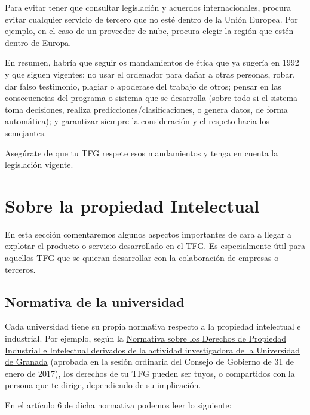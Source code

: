 Para evitar tener que consultar legislación y acuerdos internacionales, procura evitar cualquier servicio de tercero que no esté dentro de la Unión Europea. Por ejemplo, en el caso de un proveedor de nube, procura elegir la región que estén dentro de Europa.

En resumen, habría que seguir os mandamientos de ética que ya sugería \cite{EticaUCM} en 1992 y que siguen vigentes: no usar el ordenador para dañar a otras personas, robar, dar falso testimonio, plagiar o apoderase del trabajo de otros; pensar en las consecuencias del programa o sistema que se desarrolla (sobre todo si el sistema toma decisiones, realiza predicciones/clasificaciones, o genera datos, de forma automática); y garantizar siempre la consideración y el respeto hacia los semejantes.

Asegúrate de que tu TFG respete esos mandamientos y tenga en cuenta la legislación vigente.

\section{Sobre la propiedad Intelectual} %

En esta sección comentaremos algunos aspectos importantes de cara a llegar a explotar el producto o servicio desarrollado en el TFG. Es especialmente útil para aquellos TFG que se quieran desarrollar con la colaboración de empresas o terceros.

\subsection{Normativa de la universidad}

Cada universidad tiene su propia normativa respecto a la propiedad intelectual e industrial. Por ejemplo, según la \href{https://www.ugr.es/sites/default/files/2017-08/NCG1151.pdf}{Normativa sobre los Derechos de Propiedad Industrial e Intelectual derivados de la actividad investigadora de la Universidad de Granada} (aprobada en la sesión ordinaria del Consejo de Gobierno de 31 de enero de 2017), los derechos de tu TFG pueden ser tuyos, o compartidos con la persona que te dirige, dependiendo de su implicación.

En el artículo 6 de dicha normativa podemos leer lo siguiente:

